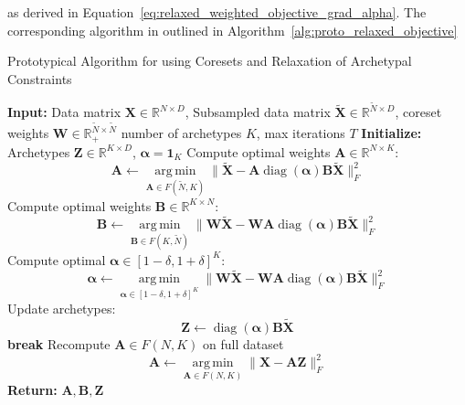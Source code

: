\documentclass[oneside]{article}
\begin{document}
as derived in Equation~\ref{eq:relaxed_weighted_objective_grad_alpha}. The corresponding algorithm in outlined in Algorithm~\ref{alg:proto_relaxed_objective}

\begin{algorithm}[H]
    \caption{Prototypical Algorithm for using Coresets and Relaxation of Archetypal Constraints}
    \label{alg:proto_relaxed_weighted_objective}
    \begin{algorithmic}[1]
    \State \textbf{Input:} Data matrix $\mathbf{X} \in \mathbb{R}^{N \times D}$, Subsampled data matrix $\tilde{\mathbf{X}} \in \mathbb{R}^{\tilde{N} \times D}$, coreset weights $\mathbf{W} \in \mathbb{R}_+^{\tilde{N} \times \tilde{N}}$ number of archetypes $K$, max iterations $T$
    \State \textbf{Initialize:} Archetypes $\mathbf{Z} \in \mathbb{R}^{K \times D}$, $\boldsymbol{\alpha} = \mathbf{1}_K$
        \State Compute optimal weights $\mathbf{A} \in \mathbb{R}^{N \times K}$:
        \begin{equation}
        \mathbf{A} \gets \operatorname*{arg\,min}_{\mathbf{A} \in F(\tilde{N}, K)} \| \tilde{\mathbf{X}} - {\mathbf{A}} \operatorname{diag}(\boldsymbol{\alpha}) \mathbf{B} \tilde{\mathbf{X}} \|_F^2
        \end{equation}
        \State Compute optimal weights $\mathbf{B} \in \mathbb{R}^{K \times N}$:
        \begin{equation}
        \mathbf{B} \gets \operatorname*{arg\,min}_{\mathbf{B} \in F(K, \tilde{N})} \| \mathbf{W} \tilde{\mathbf{X}} - \mathbf{W} {\mathbf{A}} \operatorname{diag}(\boldsymbol{\alpha}) \mathbf{B} \tilde{\mathbf{X}} \|_F^2
        \end{equation}
        \State Compute optimal $\boldsymbol{\alpha} \in [1-\delta, 1+\delta]^K$:
        \begin{equation}
        \boldsymbol{\alpha} \gets \operatorname*{arg\,min}_{\boldsymbol{\alpha} \in [1-\delta, 1+\delta]^K} \| \mathbf{W} \tilde{\mathbf{X}} - \mathbf{W} {\mathbf{A}} \operatorname{diag}(\boldsymbol{\alpha}) \mathbf{B} \tilde{\mathbf{X}} \|_F^2
        \end{equation}
        \State Update archetypes:
        \begin{equation}
        \mathbf{Z} \gets \operatorname{diag}(\boldsymbol{\alpha}) \mathbf{B} \tilde{\mathbf{X}}
        \end{equation}
            \State \textbf{break}
        \EndIf
    \EndFor
    \State Recompute $\mathbf{A} \in F(N, K)$ on full dataset
    \begin{equation}
    \mathbf{A} \gets \operatorname*{arg\,min}_{\mathbf{A} \in F(N, K)} \| \mathbf{X} - {\mathbf{A}} \mathbf{Z} \|_F^2
    \end{equation}
    \State \textbf{Return:} $\mathbf{A}, \mathbf{B}, \mathbf{Z}$
    \end{algorithmic}
\end{algorithm}
\end{document}
